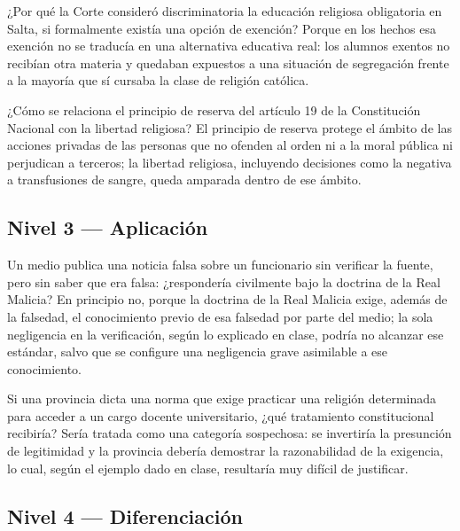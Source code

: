 \documentclass[12pt,oneside]{book}
\begin{document}
\begin{exercise}{¿Por qué la Corte consideró discriminatoria la educación religiosa obligatoria en Salta, si formalmente existía una opción de exención?}
Porque en los hechos esa exención no se traducía en una alternativa educativa real: los alumnos exentos no recibían otra materia y quedaban expuestos a una situación de segregación frente a la mayoría que sí cursaba la clase de religión católica.
\end{exercise}

\begin{exercise}{¿Cómo se relaciona el principio de reserva del artículo 19 de la Constitución Nacional con la libertad religiosa?}
El principio de reserva protege el ámbito de las acciones privadas de las personas que no ofenden al orden ni a la moral pública ni perjudican a terceros; la libertad religiosa, incluyendo decisiones como la negativa a transfusiones de sangre, queda amparada dentro de ese ámbito.
\end{exercise}

\subsection*{Nivel 3 --- Aplicación}

\begin{exercise}{Un medio publica una noticia falsa sobre un funcionario sin verificar la fuente, pero sin saber que era falsa: ¿respondería civilmente bajo la doctrina de la Real Malicia?}
En principio no, porque la doctrina de la Real Malicia exige, además de la falsedad, el conocimiento previo de esa falsedad por parte del medio; la sola negligencia en la verificación, según lo explicado en clase, podría no alcanzar ese estándar, salvo que se configure una negligencia grave asimilable a ese conocimiento.
\end{exercise}

\begin{exercise}{Si una provincia dicta una norma que exige practicar una religión determinada para acceder a un cargo docente universitario, ¿qué tratamiento constitucional recibiría?}
Sería tratada como una categoría sospechosa: se invertiría la presunción de legitimidad y la provincia debería demostrar la razonabilidad de la exigencia, lo cual, según el ejemplo dado en clase, resultaría muy difícil de justificar.
\end{exercise}

\subsection*{Nivel 4 --- Diferenciación}
\end{document}
